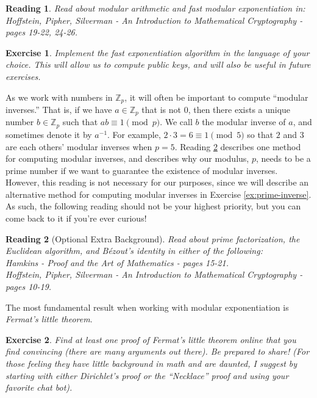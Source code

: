 \documentclass[12pt]{article}
\newcommand{\Z}[0]{\mathbb{Z}}
\newtheorem{exercise}{Exercise}
\newtheorem{reading}{Reading}
\theoremstyle{definition}
\theoremstyle{remark}
\theoremstyle{definition}
\begin{document}
\begin{reading}\label{modular}
Read about modular arithmetic and fast modular exponentiation in:\\
Hoffstein, Pipher, Silverman - An Introduction to Mathematical Cryptography - pages 19-22, 24-26.
\end{reading}

\begin{exercise}\label{ex:Fast-Exp}
Implement the fast exponentiation algorithm in the language of your choice. This will allow us to compute public keys, and will also be useful in future exercises.
\end{exercise}

As we work with numbers in $\Z_p$, it will often be important to compute ``modular inverses.'' That is, if we have $a\in\Z_p$ that is not $0$, then there exists a unique number $b\in\Z_p$ such that $ab \equiv 1\pmod p$. We call $b$ the modular inverse of $a$, and sometimes denote it by $a^{-1}$. For example, $2\cdot 3 = 6\equiv 1\pmod 5$ so that $2$ and $3$ are each others' modular inverses when $p=5$. Reading \ref{euclidean-background} describes one method for computing modular inverses, and describes why our modulus, $p$, needs to be a prime number if we want to guarantee the existence of modular inverses. However, this reading is not necessary for our purposes, since we will describe an alternative method for computing modular inverses in Exercise \ref{ex:prime-inverse}. As such, the following reading should not be your highest priority, but you can come back to it if you're ever curious!

\begin{reading}[Optional Extra Background]\label{euclidean-background}
Read about prime factorization, the Euclidean algorithm, and B{\'e}zout's identity in either of the following:\\
Hamkins - Proof and the Art of Mathematics - pages 15-21.\\
Hoffstein, Pipher, Silverman - An Introduction to Mathematical Cryptography - pages 10-19.
\end{reading}

The most fundamental result when working with modular exponentiation is \emph{Fermat's little theorem}.

\begin{exercise}\label{ex:FLT}
Find at least one proof of Fermat’s little theorem online that you find convincing (there are many arguments out there). Be prepared to share! (For those feeling they have little background in math and are daunted, I suggest by starting with either Dirichlet's proof or the ``Necklace'' proof and using your favorite chat bot).
\end{exercise}
\end{document}
